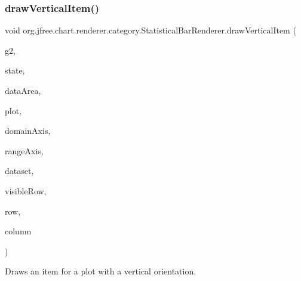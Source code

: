 \subsubsection{\texorpdfstring{draw\+Vertical\+Item()}{drawVerticalItem()}}
{\footnotesize\ttfamily void org.\+jfree.\+chart.\+renderer.\+category.\+Statistical\+Bar\+Renderer.\+draw\+Vertical\+Item (\begin{DoxyParamCaption}\item[{Graphics2D}]{g2,  }\item[{\mbox{\hyperlink{classorg_1_1jfree_1_1chart_1_1renderer_1_1category_1_1_category_item_renderer_state}{Category\+Item\+Renderer\+State}}}]{state,  }\item[{Rectangle2D}]{data\+Area,  }\item[{\mbox{\hyperlink{classorg_1_1jfree_1_1chart_1_1plot_1_1_category_plot}{Category\+Plot}}}]{plot,  }\item[{\mbox{\hyperlink{classorg_1_1jfree_1_1chart_1_1axis_1_1_category_axis}{Category\+Axis}}}]{domain\+Axis,  }\item[{\mbox{\hyperlink{classorg_1_1jfree_1_1chart_1_1axis_1_1_value_axis}{Value\+Axis}}}]{range\+Axis,  }\item[{\mbox{\hyperlink{interfaceorg_1_1jfree_1_1data_1_1statistics_1_1_statistical_category_dataset}{Statistical\+Category\+Dataset}}}]{dataset,  }\item[{int}]{visible\+Row,  }\item[{int}]{row,  }\item[{int}]{column }\end{DoxyParamCaption})\hspace{0.3cm}{\ttfamily [protected]}}

Draws an item for a plot with a vertical orientation.


